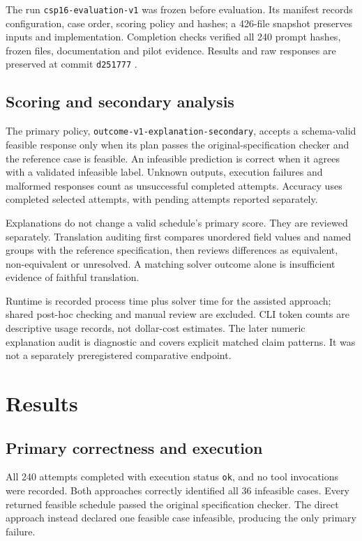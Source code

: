 \documentclass[11pt,a4paper]{article}
\newcommand{\code}[1]{\texttt{#1}}
\begin{document}
The run \code{csp16-evaluation-v1} was frozen before evaluation. Its manifest
records configuration, case order, scoring policy and hashes; a 426-file
snapshot preserves inputs and implementation. Completion checks verified
all 240 prompt hashes, frozen files, documentation and pilot evidence.
Results and raw responses are preserved at commit \code{d251777} \cite{repo}.

\subsection{Scoring and secondary analysis}
The primary policy, \code{outcome-v1-explanation-secondary}, accepts a
schema-valid feasible response only when its plan passes the original-specification
checker and the reference case is feasible. An infeasible prediction is
correct when it agrees with a validated infeasible label. Unknown outputs,
execution failures and malformed responses count as unsuccessful completed
attempts. Accuracy uses completed selected attempts, with pending attempts
reported separately.

Explanations do not change a valid schedule's primary score. They are
reviewed separately. Translation auditing first compares unordered field
values and named groups with the reference specification, then reviews
differences as equivalent, non-equivalent or unresolved. A matching solver
outcome alone is insufficient evidence of faithful translation.

Runtime is recorded process time plus solver time for the assisted approach;
shared post-hoc checking and manual review are excluded. CLI token counts
are descriptive usage records, not dollar-cost estimates. The later numeric
explanation audit is diagnostic and covers explicit matched claim patterns.
It was not a separately preregistered comparative endpoint.

\par
\section{Results}
\subsection{Primary correctness and execution}
All 240 attempts completed with execution status \code{ok}, and no tool
invocations were recorded. Both approaches correctly identified all 36
infeasible cases. Every returned feasible schedule passed the original
specification checker. The direct approach instead declared one feasible
case infeasible, producing the only primary failure.
\end{document}
